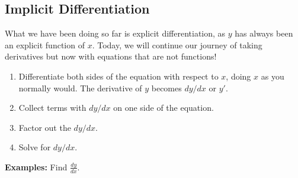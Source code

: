 \subsection*{Implicit Differentiation}
What we have been doing so far is explicit differentiation, as $y$ has always been an explicit function of $x$. Today, we will continue our journey of taking derivatives but now with equations that are not functions!\\
\begin{tcolorbox}[title= STEPS FOR IMPLICIT DIFFERENTIATION,colframe=black,sharp corners,colback=white,colbacktitle=white,coltitle=black,boxrule=1pt]
    \begin{enumerate}
        \item Differentiate both sides of the equation with respect to $x$, doing $x$ as you normally would. The derivative of $y$ becomes $dy/dx$ or $y'$.
        \item Collect terms with $dy/dx$ on one side of the equation.
        \item Factor out the $dy/dx$.
        \item Solve for $dy/dx$.
    \end{enumerate}
\end{tcolorbox}
\vspace{.15cm}
\noindent\textbf{Examples:} Find $\displaystyle\frac{dy}{dx}$.
